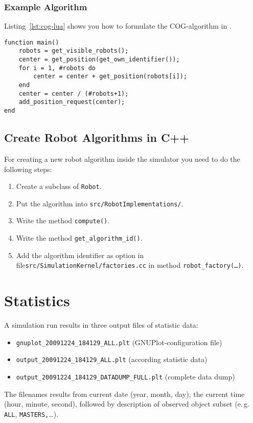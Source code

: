 \documentclass[a4paper,halfparskip,11pt,twoside]{scrartcl}
\begin{document}
\subsubsection{Example Algorithm}
Listing~\ref{lst:cog-lua} shows you how to formulate the COG-algorithm in \Lua.

\lstset{language=c}
\begin{lstlisting}[caption={COG algorithm in Lua},label=lst:cog-lua]
function main() 
    robots = get_visible_robots();
    center = get_position(get_own_identifier());
    for i = 1, #robots do
        center = center + get_position(robots[i]);
    end
    center = center / (#robots+1);
    add_position_request(center);
end
\end{lstlisting}

\subsection{Create Robot Algorithms in C++}
For creating a new robot algorithm inside the simulator you need to do the following steps:
\begin{enumerate}
	\item Create a subclass of \texttt{Robot}.
	\item Put the algorithm into \texttt{src/RobotImplementations/}.
	\item Write the method \texttt{compute()}.
	\item Write the method \texttt{get\_algorithm\_id()}.
	\item Add the algorithm identifier as option in file\newline \texttt{src/SimulationKernel/factories.cc} in method \texttt{robot\_factory(\dots)}.
\end{enumerate}



\section{Statistics}
A simulation run results in three output files of statistic data:

\begin{itemize}
\item \texttt{gnuplot\_20091224\_184129\_ALL.plt} (GNUPlot-configuration file)
\item \texttt{output\_20091224\_184129\_ALL.plt} (according statistic data)
\item \texttt{output\_20091224\_184129\_DATADUMP\_FULL.plt} (complete data dump)
\end{itemize}

The filenames results from current date (year, month, day), the current time (hour, minute, second), followed by description of observed object subset (e.\,g. \texttt{ALL}, \linebreak \texttt{MASTERS,}\dots).

\newpage
\appendix


\newpage 


\newpage
\thispagestyle{empty}
~
\end{document}
